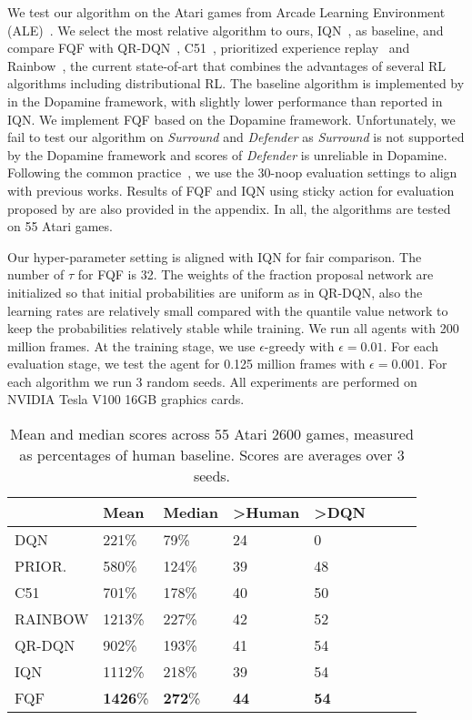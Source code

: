 \documentclass{article}
\begin{document}
We test our algorithm on the Atari games from Arcade Learning Environment (ALE)~\cite{bellemare2013arcade}. We select the most relative algorithm to ours, IQN~\citep{dabney2018implicit}, as baseline, and compare FQF with QR-DQN~\citep{dabney2018distributional}, C51~\citep{bellemare2017distributional}, prioritized experience replay~\citep{schaul2016prioritized} and Rainbow~\citep{hessel2018rainbow}, the current state-of-art that combines the advantages of several RL algorithms including distributional RL. The baseline algorithm is implemented by \cite{castro18dopamine} in the Dopamine framework, with slightly lower performance than reported in IQN. We implement FQF based on the Dopamine framework. Unfortunately, we fail to test our algorithm on \textit{Surround} and \textit{Defender} as \textit{Surround} is not supported by the Dopamine framework and scores of \textit{Defender} is unreliable in Dopamine. Following the common practice~\citep{van2016deep}, we use the 30-noop evaluation settings to align with previous works. Results of FQF and IQN using sticky action for evaluation proposed by \cite{machado2018revisiting} are also provided in the appendix. In all, the algorithms are tested on 55 Atari games.

Our hyper-parameter setting is aligned with IQN for fair comparison. The number of $\tau$ for FQF is 32. The weights of the fraction proposal network are initialized so that initial probabilities are uniform as in QR-DQN, also the learning rates are relatively small compared with the quantile value network to keep the probabilities relatively stable while training. We run all agents with 200 million frames. At the training stage, we use $\epsilon$-greedy with $\epsilon=0.01$. For each evaluation stage, we test the agent for 0.125 million frames with $\epsilon=0.001$. For each algorithm we run 3 random seeds. All experiments are performed on NVIDIA Tesla V100 16GB graphics cards. 

\begin{table*}[ht!]
	\centering
    \begin{tabular}{llllllll}
		\hline \hline
		& Mean & Median & >Human & >DQN \\
		\midrule
		DQN & 221\% & 79\% & 24 & 0 \\
		PRIOR. & 580\% & 124\% & 39 & 48 \\
		C51 & 701\% & 178\% & 40 & 50 \\
		RAINBOW & 1213\% & 227\% & 42 & 52\\
		QR-DQN & 902\% & 193\% & 41 & 54\\
		IQN & 1112\% & 218\%  & 39 & 54 \\
		\bottomrule
		FQF & \textbf{1426}\% & \textbf{272}\%  & \textbf{44} & \textbf{54}
	\end{tabular}
\caption{Mean and median scores across 55 Atari 2600 games, measured as percentages of human baseline. Scores are averages over 3 seeds.} \label{scores-table}
\end{table*}
\end{document}
